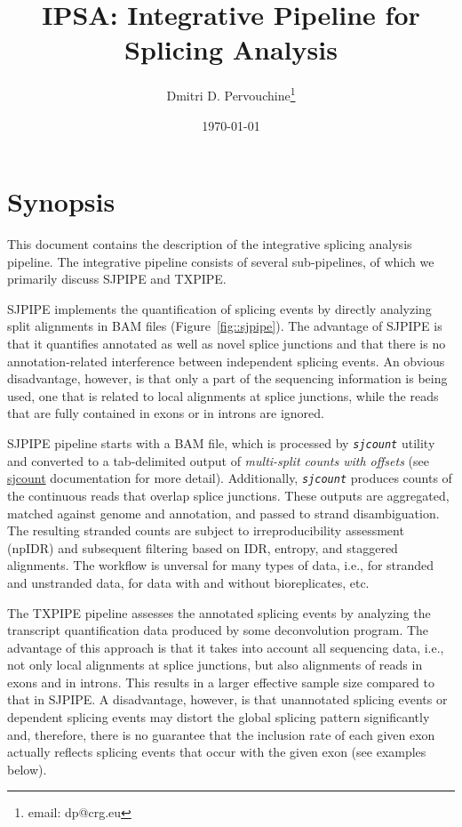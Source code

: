 \documentclass{article}
\newcommand{\prog}[1]{{\tt\em #1}}
\begin{document}
\title{IPSA: Integrative Pipeline for Splicing Analysis}
\author{Dmitri D. Pervouchine\thanks{email: dp@crg.eu}}

\date{\today}
\maketitle
\tableofcontents

\section{Synopsis}
This document contains the description of the integrative splicing analysis pipeline. The integrative pipeline
consists of several sub-pipelines, of which we primarily discuss SJPIPE and TXPIPE.

SJPIPE implements the quantification of splicing events by directly analyzing split alignments 
in BAM files (Figure~\ref{fig::sjpipe}). The advantage of SJPIPE is that it quantifies annotated 
as well as novel splice junctions and that there is no annotation-related interference between 
independent splicing events. An obvious disadvantage, however, is that only a part of the 
sequencing information is being used, one that is related to local alignments at splice junctions, 
while the reads that are fully contained in exons or in introns are ignored.

SJPIPE pipeline starts with a BAM file, which is processed by \prog{sjcount} utility and converted to a tab-delimited 
output of {\em multi-split counts with offsets} (see \href{https://github.com/pervouchine/sjcount}{sjcount} documentation 
for more detail). Additionally, \prog{sjcount} produces counts of the continuous reads that overlap splice junctions.
These outputs are aggregated, matched against genome and annotation, and passed to strand disambiguation.
The resulting stranded counts are subject to irreproducibility assessment (npIDR) and subsequent filtering 
based on IDR, entropy, and staggered alignments. The workflow is unversal for many types of data, i.e., for stranded 
and unstranded data, for data with and without bioreplicates, etc.

The TXPIPE pipeline assesses the annotated splicing events by analyzing the transcript quantification data produced 
by some deconvolution program. The advantage of this approach is that it takes into account all sequencing data, i.e., 
not only local alignments at splice junctions, but also alignments of reads in exons and in introns. This results in 
a larger effective sample size compared to that in SJPIPE. A disadvantage, however, is that unannotated splicing events
or dependent splicing events may distort the global splicing pattern significantly and, therefore, there is no guarantee 
that the inclusion rate of each given exon actually reflects splicing events that occur with the given exon (see examples 
below).
\end{document}
